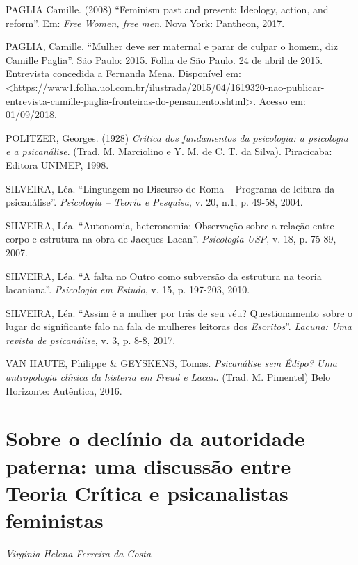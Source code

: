 PAGLIA Camille. (2008) ``Feminism past and present: Ideology, action,
and reform''. Em: \emph{Free Women, free men}. Nova York: Pantheon,
2017.

PAGLIA, Camille. ``Mulher deve ser maternal e parar de culpar o homem,
diz Camille Paglia''. São Paulo: 2015. Folha de São Paulo. 24 de abril
de 2015. Entrevista concedida a Fernanda Mena. Disponível em:
\textless{}https://www1.folha.uol.com.br/ilustrada/2015/04/1619320-nao-publicar-entrevista-camille-paglia-fronteiras-do-pensamento.shtml\textgreater{}.
Acesso em: 01/09/2018.

POLITZER, Georges. (1928) \emph{Crítica dos fundamentos da psicologia: a
psicologia e a psicanálise}. (Trad. M. Marciolino e Y. M. de C. T. da
Silva). Piracicaba: Editora UNIMEP, 1998.

SILVEIRA, Léa. ``Linguagem no Discurso de Roma -- Programa de leitura da
psicanálise''. \emph{Psicologia -- Teoria e Pesquisa}, v. 20, n.1, p.
49-58, 2004.

SILVEIRA, Léa. ``Autonomia, heteronomia: Observação sobre a relação
entre corpo e estrutura na obra de Jacques Lacan''. \emph{Psicologia
USP}, v. 18, p. 75-89, 2007.

SILVEIRA, Léa. ``A falta no Outro como subversão da estrutura na teoria
lacaniana''. \emph{Psicologia em Estudo}, v. 15, p. 197-203, 2010.

SILVEIRA, Léa. ``Assim é a mulher por trás de seu véu? Questionamento
sobre o lugar do significante falo na fala de mulheres leitoras dos
\emph{Escritos}''. \emph{Lacuna: Uma revista de psicanálise}, v. 3, p.
8-8, 2017.

VAN HAUTE, Philippe \& GEYSKENS, Tomas. \emph{Psicanálise sem Édipo? Uma
antropologia clínica da histeria em Freud e Lacan}. (Trad. M. Pimentel)
Belo Horizonte: Autêntica, 2016.

\chapter*{Sobre o declínio da autoridade paterna: uma discussão entre
Teoria Crítica e psicanalistas feministas}


\begin{flushright}
\emph{Virginia Helena Ferreira da Costa}
\end{flushright}


